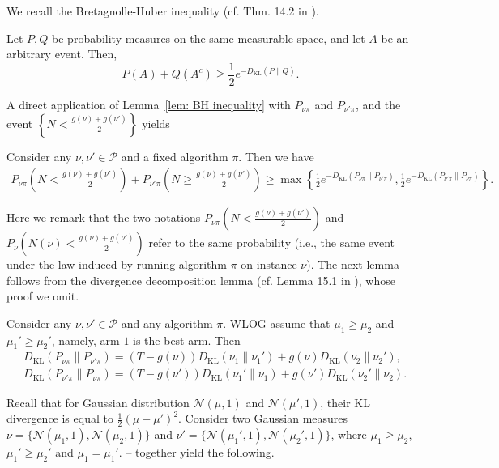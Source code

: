 \documentclass[nonblindrev]{informs3_noinforms}
\begin{document}
{
We recall the Bretagnolle-Huber inequality (cf. Thm. 14.2 in \cite{lattimore2020bandit}).
\begin{lemma}\label{lem: BH inequality}
  Let $P, Q$ be probability measures on the same measurable space, and let $A$ be an arbitrary event. Then,
  \[
  P(A) + Q(A^c) \ge \frac{1}{2}e^{-D_{\text{KL}}(P\|Q)}.
  \]
\end{lemma}
A direct application of 
Lemma~\ref{lem: BH inequality} with $P_{\nu\pi}$ and $P_{\nu'\pi}$, and the event $\left\{N < \frac{g(\nu) + g(\nu')}{2}\right\}$ yields
\begin{lemma}\label{lem:Bretagnolle-Huber}
Consider any $\nu,\nu'\in\mathcal P$ and a fixed algorithm $\pi$. Then we have
    \begin{align*}
        P_{\nu\pi}\left(N<\frac{g(\nu)+g(\nu')}{2}\right)+P_{\nu'\pi}\left(N\geq\frac{g(\nu)+g(\nu')}{2}\right)\geq\max\left\{\frac{1}{2}e^{-D_{\text{KL}}(P_{\nu\pi}\|P_{\nu'\pi})},\frac{1}{2}e^{-D_{\text{KL}}(P_{\nu'\pi}\|P_{\nu\pi})} \right\}.
    \end{align*}
\end{lemma} 
Here we remark that the two notations $P_{\nu\pi} \left(N<\frac{g(\nu)+g(\nu')}{2}\right)$ and $P_{\nu}\left(N(\nu)<\frac{g(\nu)+g(\nu')}{2}\right)$ refer to the same probability (i.e., the same event under the law induced by running algorithm $\pi$ on instance $\nu$). The next lemma follows from the divergence decomposition lemma (cf. Lemma 15.1 in \cite{lattimore2020bandit}), whose proof we omit.
\begin{lemma}\label{lem:divergence_decomposition}
    Consider any $\nu,\nu'\in\mathcal P$ and any algorithm $\pi$. WLOG assume that $\mu_1\geq\mu_2$ and $\mu_1'\geq\mu_2'$, namely, arm $1$ is the best arm. Then 
    \begin{align*}
        & D_{\text{KL}}(P_{\nu\pi}\|P_{\nu'\pi})=(T-g(\nu))D_{\text{KL}}(\nu_1\|\nu_1')+g(\nu)D_{\text{KL}}(\nu_2\|\nu_2'),\\
        & D_{\text{KL}}(P_{\nu'\pi}\|P_{\nu\pi})=(T-g(\nu'))D_{\text{KL}}(\nu_1'\|\nu_1)+g(\nu')D_{\text{KL}}(\nu_2'\|\nu_2).
    \end{align*}
\end{lemma}
Recall that for Gaussian distribution $\mathcal{N}(\mu, 1)$ and $\mathcal{N}(\mu', 1)$, their KL divergence is equal to $\frac{1}{2}(\mu- \mu')^2$. Consider two Gaussian measures $\nu = \{\mathcal{N}(\mu_1, 1), \mathcal{N}(\mu_2, 1) \}$ and $\nu' = \{\mathcal{N}(\mu_1', 1), \mathcal{N}(\mu_2', 1) \}$, where $\mu_1\geq\mu_2$, $\mu_1'\geq\mu_2'$ and $\mu_1=\mu_1'$. -- together yield the following.
}
\end{document}
